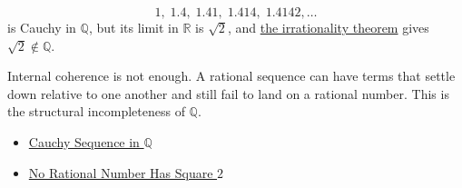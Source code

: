 \begin{remark*}
\[
1,\;1.4,\;1.41,\;1.414,\;1.4142,\dots
\]
is Cauchy in $\mathbb{Q}$, but its limit in $\mathbb{R}$ is $\sqrt{2}$, and
\hyperref[thm:sqrt2-irrational]{the irrationality theorem} gives
$\sqrt{2}\notin\mathbb{Q}$.
\end{remark*}

\begin{remark*}[Interpretation]
Internal coherence is not enough. A rational sequence can have terms that
settle down relative to one another and still fail to land on a rational
number. This is the structural incompleteness of $\mathbb{Q}$.
\end{remark*}

\begin{dependencies}
\begin{itemize}
  \item \hyperref[def:cauchy-rational]{Cauchy Sequence in $\mathbb{Q}$}
  \item \hyperref[thm:sqrt2-irrational]{No Rational Number Has Square $2$}
\end{itemize}
\end{dependencies}

